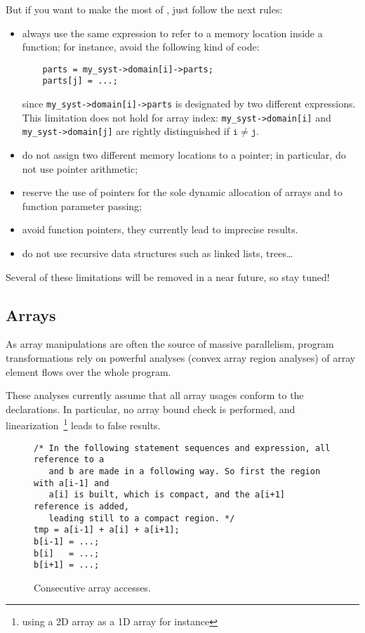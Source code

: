 \documentclass[a4paper]{article}
\begin{document}
But if you want to make the most of \Apfa, just follow the next rules:
\begin{itemize}
\item always use the same expression to refer to a memory location
  inside a function; for instance, avoid the following kind of code:
  \begin{lstlisting}
    parts = my_syst->domain[i]->parts;
    parts[j] = ...;
  \end{lstlisting}
  since \lstinline|my_syst->domain[i]->parts| is designated by two
  different expressions. This limitation does not hold for array
  index: \lstinline|my_syst->domain[i]| and
  \lstinline|my_syst->domain[j]| are rightly distinguished if
  $\mathtt{i} \neq \mathtt{j}$.
\item do not assign two different memory locations to a pointer; in
  particular, do not use pointer arithmetic;
\item reserve the use of pointers for the sole dynamic allocation of
  arrays and to function parameter passing;
\item avoid function pointers, they currently lead to imprecise results.
\item do not use recursive data structures such as linked lists, trees\ldots
\end{itemize}
Several of these limitations will be removed in a near future, so stay tuned!


\subsection{Arrays}
\label{sec:arrays}

As array manipulations are often the source of massive parallelism, \Apips
program transformations rely on powerful analyses (convex array region
analyses) of array element flows over the whole program.

These analyses currently assume that all array usages conform to the
declarations. In particular, no array bound check is performed, and
linearization~\footnote{using a 2D array as a 1D array for instance}
leads to false results.

\begin{figure}
  \centering
  \begin{lstlisting}
/* In the following statement sequences and expression, all reference to a
   and b are made in a following way. So first the region with a[i-1] and
   a[i] is built, which is compact, and the a[i+1] reference is added,
   leading still to a compact region. */
tmp = a[i-1] + a[i] + a[i+1];
b[i-1] = ...;
b[i]   = ...;
b[i+1] = ...;
  \end{lstlisting}
  \caption{Consecutive array accesses.}
  \label{fig:consecutive_array_accesses}
\end{figure}
\end{document}
